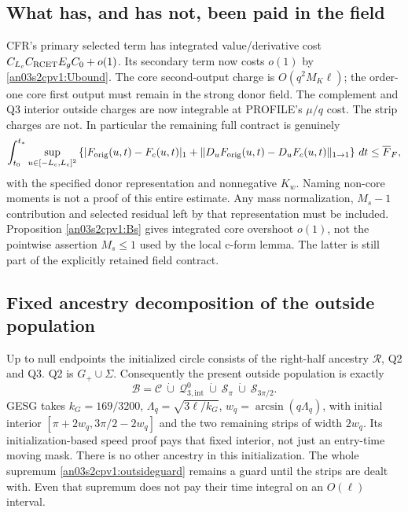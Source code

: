 \documentclass[11pt]{article}
\theoremstyle{remark}\newtheorem{remark}[theorem]{Remark}
\newcommand{\dd}{\,d}
\newcommand{\Gp}{G_+}
\newcommand{\BB}{\mathcal B}
\newcommand{\RR}{\mathcal R}
\begin{document}
\subsection*{What has, and has not, been paid in the field}
CFR's primary selected term has integrated value/derivative cost
$C_{L_c}C_{\rm RCET}E_gC_0+o(1)$. Its secondary term now costs
$o(1)$ by \eqref{an03s2cpv1:Ubound}. The core second-output
charge is $O(q^2M_K\ell)$; the order-one core first output must
remain in the strong donor field. The complement and Q3 interior
outside charges are now integrable at PROFILE's $\mu/q$ cost.
The strip charges are not. In particular the remaining full
contract is genuinely
\begin{equation}
 \int_{t_0}^{t_*}\sup_{u\in[-L_c,L_c]^2}
 \left\{|F_{\rm orig}(u,t)-F_c(u,t)|_1
 +\|D_uF_{\rm orig}(u,t)-D_uF_c(u,t)\|_{1\to1}\right\}\dd t
 \le\overline F_F,
 \label{an03s2cpv1:fullnorm}
\end{equation}
with the specified donor representation and nonnegative $K_w$.
Naming non-core moments is not a proof of this entire estimate.
Any mass normalization, $M_s-1$ contribution and selected residual
left by that representation must be included. Proposition
\ref{an03s2cpv1:Bs} gives integrated core overshoot $o(1)$, not
the pointwise assertion $M_s\le1$ used by the local c-form lemma.
The latter is still part of the explicitly retained field contract.

\subsection*{Fixed ancestry decomposition of the outside population}
Up to null endpoints the initialized circle consists of the
right-half ancestry $\RR$, Q2 and Q3. Q2 is $\Gp\cup\Sigma$.
Consequently the present outside population is exactly
\[
 \BB=\mathcal C\ \dot\cup\ \mathcal Q_{3,\mathrm{int}}^0
          \ \dot\cup\ \mathcal S_\pi\ \dot\cup\ \mathcal S_{3\pi/2}.
\]
GESG takes $k_G=169/3200$,
$\Lambda_q=\sqrt{3\ell/k_G}$, $w_q=\arcsin(q\Lambda_q)$,
with initial interior $[\pi+2w_q,3\pi/2-2w_q]$ and the two
remaining strips of width $2w_q$. Its initialization-based
speed proof pays that fixed interior, not just an entry-time
moving mask. There is no other ancestry in this initialization.
The whole supremum \eqref{an03s2cpv1:outsideguard} remains a
guard until the strips are dealt with. Even that supremum
does not pay their time integral on an $O(\ell)$ interval.
\end{document}

